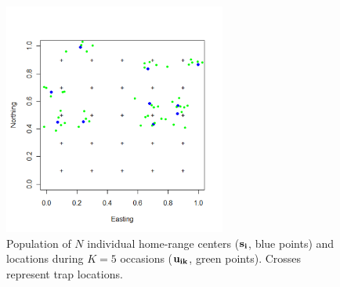 \begin{figure}
\begin{center}
\includegraphics[height=3in]{Ch1/figs/northingeasting}
\end{center}
\caption{Population of $N$ individual home-range centers ($\bf s_i$,
  blue points) and locations during $K=5$ occasions ($\bf u_{ik}$,
  green points). Crosses represent trap locations.}
\label{intro.fig.fig1}
\end{figure}



